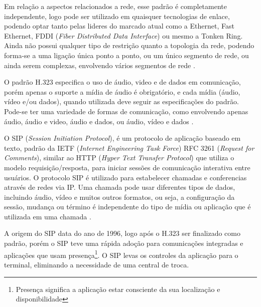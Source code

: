 Em relação a aspectos relacionados a rede, esse padrão é completamente independente, logo pode ser utilizado em quaisquer  tecnologias de enlace, podendo optar tanto pelas lideres do marcado atual como a Ethernet, Fast Ethernet, FDDI (\textit{Fiber Distributed Data Interface}) ou mesmo a Tonken Ring. Ainda não possui qualquer tipo de restrição quanto a topologia da rede, podendo forma-se a uma ligação única ponto a ponto, ou um único segmento de rede, ou ainda serem complexas, envolvendo vários segmentos de rede \cite{eduardomaronasmonks2006}.

O padrão H.323 especifica o uso de  áudio, video e de dados em comunicação, porém apenas o suporte a mídia de áudio é obrigatório, e cada mídia (áudio, vídeo e/ou dados), quando utilizada deve seguir as especificações do padrão. Pode-se ter uma variedade de formas de comunicação, como envolvendo apenas áudio, áudio e video, áudio e dados, ou áudio, vídeo e dados \cite{glauciadasilvaribeiro2011}.

O SIP (\textit{Session Initiation Protocol}), é um protocolo de aplicação baseado em texto, padrão da IETF (\textit{Internet Engineering Task Force}) RFC 3261 (\textit{Request for Comments}), similar ao HTTP (\textit{Hyper Text Transfer Protocol}) que utiliza o modelo requisição/resposta, para iniciar sessões de comunicação interativa entre usuários. O protocolo SIP é utilizado para estabelecer chamadas e conferencias através de redes via IP. Uma chamada pode usar diferentes tipos de dados, incluindo áudio, vídeo e muitos outros formatos, ou seja, a configuração da sessão, mudança ou término é independente do tipo de mídia ou aplicação que é utilizada em uma chamada \cite{adrianoramosgoncalves2001}.

A origem do SIP data do ano de 1996, logo após o H.323 ser finalizado como padrão, porém o SIP teve uma rápida adoção para comunicações integradas e aplicações que usam presença\footnote{Presença significa a aplicação estar consciente da sua localização e disponibilidade}. O SIP levas os controles da aplicação para o terminal, eliminando a necessidade de uma central de troca.

